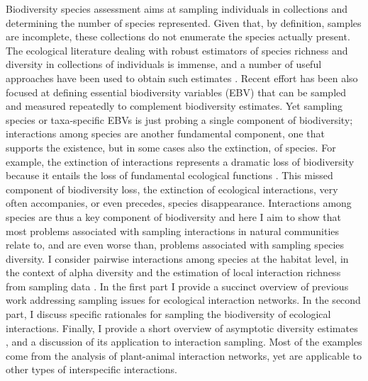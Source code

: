 \documentclass[12pt]{article}
\begin{document}
\linenumbers
Biodiversity species assessment aims at sampling individuals in collections and determining the number of species represented. Given that, by definition, samples are incomplete, these collections do not enumerate the species actually present. The ecological literature dealing with robust estimators of species richness and diversity in collections of individuals is immense, and a number of useful approaches have been used to obtain such estimates \citep{Magurran:1988mm,Gotelli:2001uo,Colwell:2004fi,Hortal:2006dc,Colwell:2009gv,Gotelli:2011tb,Chao:2014wm}. Recent effort has been also focused at defining essential biodiversity variables (EBV) \citep{Pereira:2013ji} that can be sampled and measured repeatedly to complement biodiversity estimates. Yet sampling species or taxa-specific EBVs is just probing a single component of biodiversity; interactions among species are another fundamental component, one that supports the existence, but in some cases also the extinction, of species. For example, the extinction of interactions represents a dramatic loss of biodiversity because it entails the loss of fundamental ecological functions \citep{ValienteBanuet:2014bw}. This missed component of biodiversity loss, the extinction of ecological interactions, very often accompanies, or even precedes, species disappearance. Interactions among species are thus a key component of biodiversity and here I aim to show that most problems associated with sampling interactions in natural communities relate to, and are even worse than, problems associated with sampling species diversity. I consider pairwise interactions among species at the habitat level, in the context of alpha diversity and the estimation of local interaction richness from sampling data \citep{Chao:2014wm}. In the first part I provide a succinct overview of previous work addressing sampling issues for ecological interaction networks. In the second part, I discuss specific rationales for sampling the biodiversity of ecological interactions. Finally, I provide a short overview of asymptotic diversity estimates \citep{Gotelli:2001uo}, and a discussion of its application to interaction sampling. Most of the examples come from the analysis of plant-animal interaction networks, yet are applicable to other types of interspecific interactions.
\end{document}
